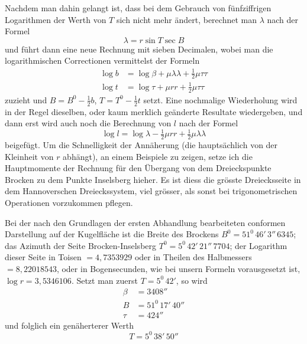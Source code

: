 %
Nachdem man dahin gelangt ist, dass bei dem Gebrauch von fünfziffrigen Logarithmen der Werth von \(T\) sich nicht mehr ändert, berechnet man \(\lambda\) nach der Formel
\[
\lambda=r\sin T\sec B
\]
und führt dann eine neue Rechnung mit sieben Decimalen, wobei man die logarithmischen Correctionen vermittelst der Formeln
\[
\begin{aligned}
\log b&=\log\beta+\mu\lambda\lambda+\tfrac12\mu\tau\tau\\
\log t&=\log\tau+\mu rr+\tfrac12\mu\tau\tau
\end{aligned}
\]
zuzieht und \(B=B^0-\frac12b\), \(T=T^0-\frac12t\) setzt. Eine nochmalige Wiederholung wird in der Regel dieselben, oder kaum merklich geänderte Resultate wiedergeben, und dann erst wird auch noch die Berechnung von \(l\) nach der Formel
\[
\log l=\log\lambda-\tfrac12\mu rr+\tfrac12\mu\lambda\lambda
\]
beigefügt. Um die Schnelligkeit der Annäherung (die hauptsächlich von der Kleinheit von \(r\) abhängt), an einem Beispiele zu zeigen, setze ich die Hauptmomente der Rechnung für den Übergang von dem Dreieckspunkte Brocken zu dem Punkte Inselsberg hieher. Es ist diess die grösste Dreiecksseite in dem Hannoverschen Dreieckssystem, viel grösser, als sonst bei trigonometrischen Operationen vorzukommen pflegen.

Bei der nach den Grundlagen der ersten Abhandlung bearbeiteten conformen Darstellung auf der Kugelfläche ist die Breite des Brockens \(B^0=51^0\,46'\,3''\,6345\); das Azimuth der Seite Brocken-Inselsberg \(T^0=5^0\,42'\,21''\,7704\); der Logarithm dieser Seite in Toisen \(=4{,}7353929\) oder in Theilen des Halbmessers \(=8{,}22018543\), oder in Bogensecunden, wie bei unsern Formeln vorausgesetzt ist, \(\log r=3{,}5346106\). Setzt man zuerst \(T=5^0\,42'\), so wird
\[
\begin{aligned}
\beta&=3408''\\
B&=51^0\,17'\,40''\\
\tau&=424''
\end{aligned}
\]
und folglich ein genäherterer Werth
\[
T=5^0\,38'\,50''
\]
